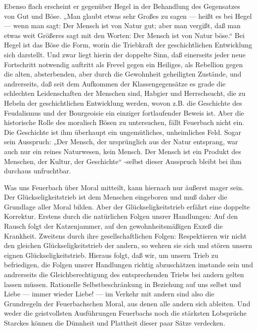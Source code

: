 Ebenso flach erscheint er gegenüber Hegel in der Behandlung des
Gegensatzes von Gut und Böse. „Man glaubt etwas sehr Großes zu sagen ---
heißt es bei Hegel --- wenn man sagt: Der Mensch ist von Natur gut; aber
man vergißt, daß man etwas weit Größeres sagt mit den Worten: Der Mensch
ist von Natur böse.`` Bei Hegel ist das Böse die Form, worin die
Triebkraft der geschichtlichen Entwicklung sich darstellt. Und zwar
liegt hierin der doppelte Sinn, daß einerseits jeder neue Fortschritt
notwendig auftritt als Frevel gegen ein Heiliges, als Rebellion gegen
die alten, absterbenden, aber durch die Gewohnheit geheiligten Zustände,
und andrerseits, daß seit dem Aufkommen der Klassengegensätze es grade
die schlechten Leidenschaften der Menschen sind, Habgier und
Herrschsucht, die zu Hebeln der geschichtlichen Entwicklung werden,
wovon z.B. die Geschichte des Feudalismus und der Bourgeoisie ein
einziger fortlaufender Beweis ist. Aber die historische Rolle des
moralisch Bösen zu untersuchen, fällt Feuerbach nicht ein. Die
Geschichte ist ihm überhaupt ein ungemütliches, unheimliches Feld. Sogar
sein Ausspruch: „Der Mensch, der ursprünglich aus der Natur entsprang,
war auch nur ein reines Naturwesen, kein Mensch. Der Mensch ist ein
Produkt des Menschen, der Kultur, der Geschichte`` -selbst dieser
Ausspruch bleibt bei ihm durchaus unfruchtbar.

Was uns Feuerbach über Moral mitteilt, kann hiernach nur äußerst
mager sein. Der Glückseligkeitstrieb ist dem Menschen eingeboren und muß
daher die Grundlage aller Moral bilden. Aber der Glückseligkeitstrieb
erfährt eine doppelte Korrektur. Erstens durch die natürlichen Folgen
unsrer Handlungen: Auf den Rausch folgt der Katzenjammer, auf den
gewohnheitsmäßigen Exzeß die Krankheit. Zweitens durch ihre
gesellschaftlichen Folgen: Respektieren wir nicht den gleichen
Glückseligkeitstrieb der andern, so wehren sie sich und stören unsern
eignen Glückseligkeitstrieb. Hieraus folgt, daß wir, um unsern Trieb zu
befriedigen, die Folgen unsrer Handlungen richtig abzuschätzen imstande
sein und andrerseits die Gleichberechtigung des entsprechenden Triebs
bei andern gelten lassen müssen. Rationelle Selbstbeschränkung in
Beziehung auf uns selbst und Liebe --- immer wieder Liebe! --- im Verkehr
mit andern sind also die Grundregeln der Feuerbachschen Moral, aus denen
alle andern sich ableiten. Und weder die geistvollsten Ausführungen
Feuerbachs noch die stärksten Lobsprüche Starckes können die Dünnheit
und Plattheit dieser paar Sätze verdecken.

